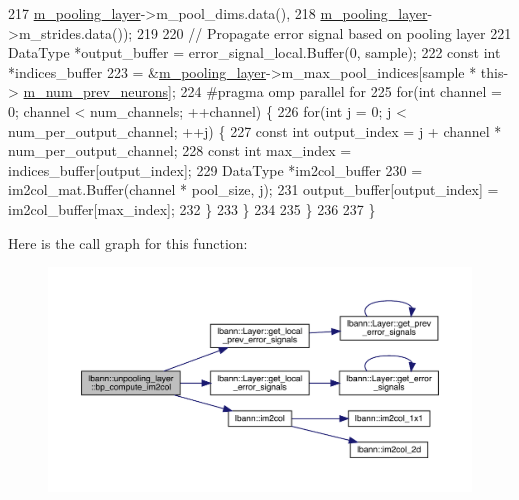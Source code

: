 \begin{DoxyCode}
217              \hyperlink{classlbann_1_1unpooling__layer_ab15a8b0680685f80c7d995e617e97a9a}{m\_pooling\_layer}->m\_pool\_dims.data(),
218              \hyperlink{classlbann_1_1unpooling__layer_ab15a8b0680685f80c7d995e617e97a9a}{m\_pooling\_layer}->m\_strides.data());
219 
220       \textcolor{comment}{// Propagate error signal based on pooling layer}
221       DataType *output\_buffer = error\_signal\_local.Buffer(0, sample);
222       \textcolor{keyword}{const} \textcolor{keywordtype}{int} *indices\_buffer
223         = &\hyperlink{classlbann_1_1unpooling__layer_ab15a8b0680685f80c7d995e617e97a9a}{m\_pooling\_layer}->m\_max\_pool\_indices[sample * this->
      \hyperlink{classlbann_1_1Layer_ac7b30f4e28d58204bfcbb76886f9136d}{m\_num\_prev\_neurons}];
224 \textcolor{preprocessor}{      #pragma omp parallel for}
225       \textcolor{keywordflow}{for}(\textcolor{keywordtype}{int} channel = 0; channel < num\_channels; ++channel) \{
226         \textcolor{keywordflow}{for}(\textcolor{keywordtype}{int} j = 0; j < num\_per\_output\_channel; ++j) \{
227           \textcolor{keyword}{const} \textcolor{keywordtype}{int} output\_index = j + channel * num\_per\_output\_channel;
228           \textcolor{keyword}{const} \textcolor{keywordtype}{int} max\_index = indices\_buffer[output\_index];
229           DataType *im2col\_buffer
230             = im2col\_mat.Buffer(channel * pool\_size, j);
231           output\_buffer[output\_index] = im2col\_buffer[max\_index];
232         \}
233       \}
234 
235     \}
236 
237   \}
\end{DoxyCode}
Here is the call graph for this function\+:\nopagebreak
\begin{figure}[H]
\begin{center}
\leavevmode
\includegraphics[width=350pt]{classlbann_1_1unpooling__layer_ad4607102ff59de2f233a87f13967cc04_cgraph}
\end{center}
\end{figure}
